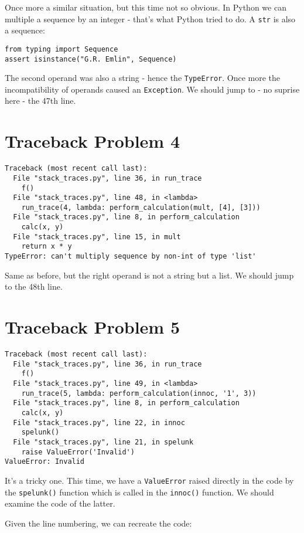 \documentclass[8pt, a4paper]{article}
\begin{document}
Once more a similar situation, but this time not so obvious. In Python we can multiple a sequence by an integer - that's what Python tried to do. A \texttt{str} is also a sequence:
\begin{verbatim}
from typing import Sequence
assert isinstance("G.R. Emlin", Sequence)
\end{verbatim}
The second operand was also a string - hence the \texttt{TypeError}. Once more the incompatibility of operands caused an \texttt{Exception}. We should jump to - no suprise here - the 47th line.

\section*{Traceback Problem 4}
\begin{verbatim}
Traceback (most recent call last):
  File "stack_traces.py", line 36, in run_trace
    f()
  File "stack_traces.py", line 48, in <lambda>
    run_trace(4, lambda: perform_calculation(mult, [4], [3]))
  File "stack_traces.py", line 8, in perform_calculation
    calc(x, y)
  File "stack_traces.py", line 15, in mult
    return x * y
TypeError: can't multiply sequence by non-int of type 'list'
\end{verbatim}

Same as before, but the right operand is not a string but a list.
We should jump to the 48th line.

\section*{Traceback Problem 5}
\begin{verbatim}
Traceback (most recent call last):
  File "stack_traces.py", line 36, in run_trace
    f()
  File "stack_traces.py", line 49, in <lambda>
    run_trace(5, lambda: perform_calculation(innoc, '1', 3))
  File "stack_traces.py", line 8, in perform_calculation
    calc(x, y)
  File "stack_traces.py", line 22, in innoc
    spelunk()
  File "stack_traces.py", line 21, in spelunk
    raise ValueError('Invalid')
ValueError: Invalid
\end{verbatim}

It's a tricky one. This time, we have a \texttt{ValueError} raised directly in the code by the \texttt{spelunk()} function which is called in the \texttt{innoc()} function. We should examine the code of the latter.

Given the line numbering, we can recreate the code:
\end{document}
